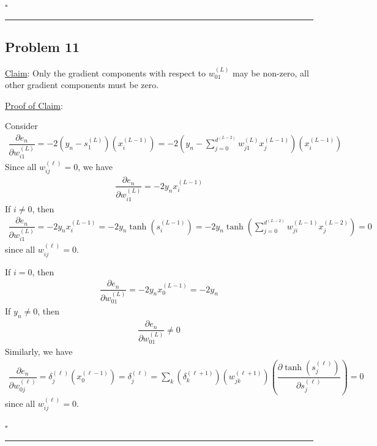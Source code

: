 \documentclass[12pt]{article}
\newcommand*{\QEDB}{\hfill\ensuremath{\square}}
\newcommand{\ParTh}[1]{\left(#1\right)}
\newcommand{\horrule}[1]{\rule{\linewidth}{#1}}
\begin{document}
\QEDB

\horrule{0.5pt}

\subsection*{Problem 11}

\underline{Claim}: Only the gradient components with respect to $w^{\ParTh{L}}_{01}$ may be non-zero, all other gradient components must be zero.

\underline{Proof of Claim}:

Consider
\begin{align}
\dfrac{\partial e_n}{\partial w^{\ParTh{L}}_{i1}}=-2\ParTh{y_n-s^{\ParTh{L}}_1}\ParTh{x^{\ParTh{L-1}}_i}=-2\ParTh{y_n-\sum_{j=0}^{d^{\ParTh{L-2}}}w^{\ParTh{L}}_{j1}x^{\ParTh{L-1}}_j}\ParTh{x^{\ParTh{L-1}}_i}
\end{align}
Since all $w^{\ParTh{\ell}}_{ij}=0$, we have
\begin{align}
\dfrac{\partial e_n}{\partial w^{\ParTh{L}}_{i1}}=-2y_nx^{\ParTh{L-1}}_i%
\end{align}
If $i\neq0$, then
\begin{align}
\dfrac{\partial e_n}{\partial w^{\ParTh{L}}_{i1}}=-2y_nx^{\ParTh{L-1}}_i=-2y_n\tanh\ParTh{s^{\ParTh{L-1}}_i}=-2y_n\tanh\ParTh{\sum_{j=0}^{d^{\ParTh{L-2}}}w^{\ParTh{L-1}}_{ji}x^{\ParTh{L-2}}_j}=0
\end{align}
since all $w^{\ParTh{\ell}}_{ij}=0$.

If $i=0$, then
\begin{align}
\dfrac{\partial e_n}{\partial w^{\ParTh{L}}_{01}}=-2y_nx^{\ParTh{L-1}}_0=-2y_n
\end{align}
If $y_n\neq0$, then
\begin{align}
\dfrac{\partial e_n}{\partial w^{\ParTh{L}}_{01}}\neq0
\end{align}
Similarly, we have
\begin{align}
\dfrac{\partial e_n}{\partial w^{\ParTh{\ell}}_{0j}}=\delta^{\ParTh{\ell}}_j\ParTh{x^{\ParTh{\ell-1}}_0}=\delta^{\ParTh{\ell}}_j=\sum_{k}\ParTh{\delta^{\ParTh{\ell+1}}_k}\ParTh{w^{\ParTh{\ell+1}}_{jk}}\ParTh{\dfrac{\partial\tanh\ParTh{s^{\ParTh{\ell}}_j}}{\partial s^{\ParTh{\ell}}_j}}=0
\end{align}
since all $w^{\ParTh{\ell}}_{ij}=0$.

\QEDB

\horrule{0.5pt}
\end{document}
